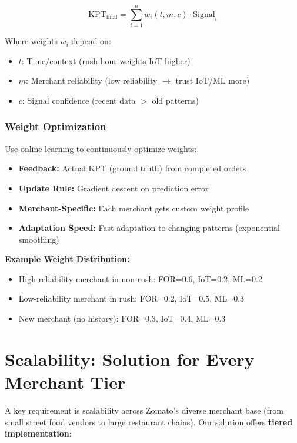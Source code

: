 \documentclass[11pt,a4paper]{article}
\begin{document}
$$\text{KPT}_{\text{final}} = \sum_{i=1}^{n} w_i(t, m, c) \cdot \text{Signal}_i$$

Where weights $w_i$ depend on:
\begin{itemize}
    \item $t$: Time/context (rush hour weights IoT higher)
    \item $m$: Merchant reliability (low reliability $\rightarrow$ trust IoT/ML more)
    \item $c$: Signal confidence (recent data $>$ old patterns)
\end{itemize}

\subsubsection{Weight Optimization}

Use online learning to continuously optimize weights:

\begin{itemize}[leftmargin=*]
    \item \textbf{Feedback:} Actual KPT (ground truth) from completed orders
    \item \textbf{Update Rule:} Gradient descent on prediction error
    \item \textbf{Merchant-Specific:} Each merchant gets custom weight profile
    \item \textbf{Adaptation Speed:} Fast adaptation to changing patterns (exponential smoothing)
\end{itemize}

\textbf{Example Weight Distribution:}
\begin{itemize}
    \item High-reliability merchant in non-rush: FOR=0.6, IoT=0.2, ML=0.2
    \item Low-reliability merchant in rush: FOR=0.2, IoT=0.5, ML=0.3
    \item New merchant (no history): FOR=0.3, IoT=0.4, ML=0.3
\end{itemize}

\newpage

\section{Scalability: Solution for Every Merchant Tier}

A key requirement is scalability across Zomato's diverse merchant base (from small street food vendors to large restaurant chains). Our solution offers \textbf{tiered implementation}:
\end{document}
